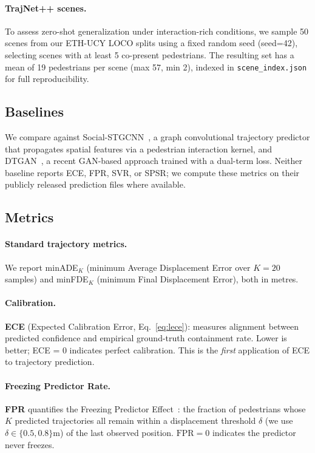 \paragraph{TrajNet++ scenes.}
To assess zero-shot generalization under interaction-rich conditions, we sample
50 scenes from our ETH-UCY LOCO splits using a fixed random seed (seed=42),
selecting scenes with at least 5 co-present pedestrians. The resulting set has
a mean of 19 pedestrians per scene (max 57, min 2), indexed in
\texttt{scene\_index.json} for full reproducibility.

\subsection{Baselines}
\label{sec:exp:baselines}

We compare against Social-STGCNN~\cite{mohamed2020socialstgcnn}, a graph
convolutional trajectory predictor that propagates spatial features via a
pedestrian interaction kernel, and DTGAN~\cite{dtgan2025}, a recent
GAN-based approach trained with a dual-term loss. Neither baseline reports
ECE, FPR, SVR, or SPSR; we compute these metrics on their publicly released
prediction files where available.

\subsection{Metrics}
\label{sec:exp:metrics}

\paragraph{Standard trajectory metrics.}
We report minADE$_K$ (minimum Average Displacement Error over $K=20$ samples)
and minFDE$_K$ (minimum Final Displacement Error), both in metres.

\paragraph{Calibration.}
\textbf{ECE} (Expected Calibration Error, Eq.~\eqref{eq:lece}): measures
alignment between predicted confidence and empirical ground-truth containment
rate. Lower is better; ECE = 0 indicates perfect calibration.
This is the \emph{first} application of ECE to trajectory prediction.

\paragraph{Freezing Predictor Rate.}
\textbf{FPR} quantifies the Freezing Predictor Effect~\cite{trautman2010iros}:
the fraction of pedestrians whose $K$ predicted trajectories all remain within
a displacement threshold $\delta$ (we use $\delta \in \{0.5, 0.8\}$m) of the
last observed position. $\text{FPR} = 0$ indicates the predictor never freezes.

